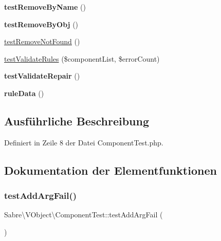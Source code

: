 \begin{DoxyCompactItemize}
{\bfseries test\+Remove\+By\+Name} ()
\item 
\mbox{\label{class_sabre_1_1_v_object_1_1_component_test_ae43f0f073eafa37291f3cc839a98d88b}} 
{\bfseries test\+Remove\+By\+Obj} ()
\item 
\mbox{\hyperlink{class_sabre_1_1_v_object_1_1_component_test_adef0947fc4df6f9308f1705ccdfbfa51}{test\+Remove\+Not\+Found}} ()
\item 
\mbox{\hyperlink{class_sabre_1_1_v_object_1_1_component_test_af9315fddf7d3b1820121005c7ee29873}{test\+Validate\+Rules}} (\$component\+List, \$error\+Count)
\item 
\mbox{\label{class_sabre_1_1_v_object_1_1_component_test_a3f410bef48fc2416e8bcecfe064c7ebd}} 
{\bfseries test\+Validate\+Repair} ()
\item 
\mbox{\label{class_sabre_1_1_v_object_1_1_component_test_a21a8615b80a8cd82ad8f205c65923ff2}} 
{\bfseries rule\+Data} ()
\end{DoxyCompactItemize}


\subsection{Ausführliche Beschreibung}


Definiert in Zeile 8 der Datei Component\+Test.\+php.



\subsection{Dokumentation der Elementfunktionen}
\mbox{\label{class_sabre_1_1_v_object_1_1_component_test_a58a476c590d7970fe54c0bc590ace4be}} 
\subsubsection{\texorpdfstring{test\+Add\+Arg\+Fail()}{testAddArgFail()}}
{\footnotesize\ttfamily Sabre\textbackslash{}\+V\+Object\textbackslash{}\+Component\+Test\+::test\+Add\+Arg\+Fail (\begin{DoxyParamCaption}{ }\end{DoxyParamCaption})}

